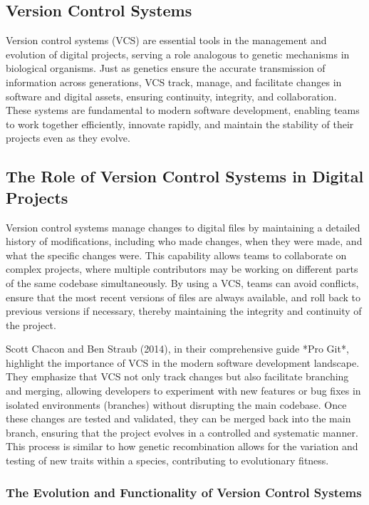 \documentclass[12pt,twoside]{article}
\begin{document}
\subsection{Version Control Systems}

Version control systems (VCS) are essential tools in the management and evolution of digital projects, serving a role analogous to genetic mechanisms in biological organisms. Just as genetics ensure the accurate transmission of information across generations, VCS track, manage, and facilitate changes in software and digital assets, ensuring continuity, integrity, and collaboration. These systems are fundamental to modern software development, enabling teams to work together efficiently, innovate rapidly, and maintain the stability of their projects even as they evolve.

\subsection{The Role of Version Control Systems in Digital Projects}

Version control systems manage changes to digital files by maintaining a detailed history of modifications, including who made changes, when they were made, and what the specific changes were. This capability allows teams to collaborate on complex projects, where multiple contributors may be working on different parts of the same codebase simultaneously. By using a VCS, teams can avoid conflicts, ensure that the most recent versions of files are always available, and roll back to previous versions if necessary, thereby maintaining the integrity and continuity of the project.

Scott Chacon and Ben Straub (2014), in their comprehensive guide *Pro Git*, highlight the importance of VCS in the modern software development landscape. They emphasize that VCS not only track changes but also facilitate branching and merging, allowing developers to experiment with new features or bug fixes in isolated environments (branches) without disrupting the main codebase. Once these changes are tested and validated, they can be merged back into the main branch, ensuring that the project evolves in a controlled and systematic manner. This process is similar to how genetic recombination allows for the variation and testing of new traits within a species, contributing to evolutionary fitness.

\subsubsection{The Evolution and Functionality of Version Control Systems}
\end{document}
